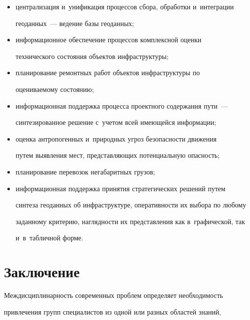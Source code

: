      \begin{itemize}


\item централизация и~унификация процессов сбора, обработки и~интеграции 


геоданных~--- ведение базы геоданных; 


\item информационное обеспечение процессов комплексной оценки 


технического со\-сто\-яния объектов инфраструктуры;


\item планирование ремонтных работ объектов инфраструктуры по 


оце\-ни\-ва\-емо\-му со\-сто\-янию;


\item информационная поддержка процесса проектного содержания пути~--- 


синтезированное решение с~учетом всей име\-ющей\-ся информации;


\item оценка антропогенных и~природных угроз безопас\-ности движения 


путем выявления мест, пред\-став\-ля\-ющих потенциальную опас\-ность;


\item планирование перевозок негабаритных грузов;


\item информационная поддержка принятия стратегических решений путем 


синтеза геоданных об инфраструктуре, опе\-ра\-тив\-ности их выбора по любому 


заданному критерию, на\-гляд\-ности их пред\-став\-ле\-ния как в~графической, так 


и~в~таб\-лич\-ной форме.


\end{itemize}





\section{Заключение}





  Междисциплинарность современных проблем определяет не\-об\-хо\-ди\-мость 


привлечения групп специалистов из одной или разных областей знаний, 


